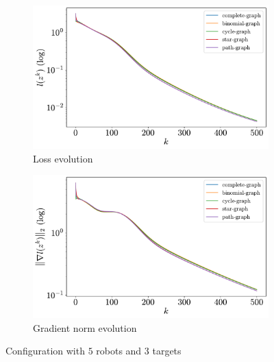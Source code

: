 \documentclass[a4paper,11pt,oneside]{book}
\begin{document}
\begin{figure}[H]
      \centering
      \begin{subfigure}[t]{0.49\textwidth}
            \centering
            \includegraphics[width=\linewidth]{./figs/tracking/loss_5_3_2_500.pdf} 
            \caption{Loss evolution}
      \end{subfigure}
      \hfill
      \begin{subfigure}[t]{0.49\textwidth}
            \centering
            \includegraphics[width=\linewidth]{./figs/tracking/gradient_5_3_2_500.pdf} 
            \caption{Gradient norm evolution}
      \end{subfigure}
      \caption{Configuration with $5$ robots and $3$ targets}
\end{figure}
\end{document}
